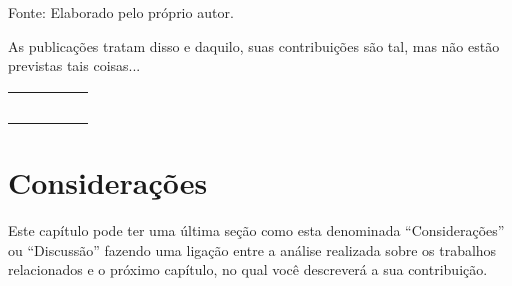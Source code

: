 \begin{quadro}[!htbp]
\begin{center}
 \end{center} 
 \raggedright Fonte: Elaborado pelo próprio autor. 
\end{quadro}


As publicações tratam disso e daquilo, suas contribuições são tal, mas não estão previstas tais coisas...

\begin{table}[]
\begin{tabular}{lllll}
 &  &  &  &  \\
 &  &  &  &  \\
 &  &  &  &  \\
 &  &  &  &  \\
 &  &  &  & 
\end{tabular}
\end{table}




\section{Considerações}
\label{s_c3_consideracoes}

Este capítulo pode ter uma última seção como esta denominada ``Considerações'' ou ``Discussão'' fazendo uma ligação entre a análise realizada sobre os trabalhos relacionados e o próximo capítulo, no qual você descreverá a sua contribuição.